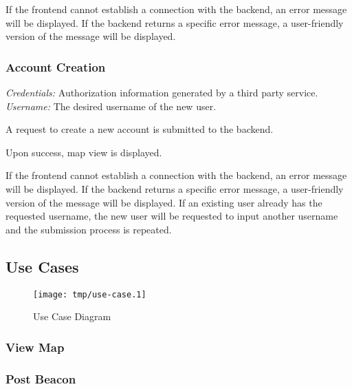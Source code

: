                 If the frontend cannot establish a connection with the backend,
                an error message will be displayed. \newline
                If the backend returns a specific error message, a user-friendly
                version of the message will be displayed.

        \subsubsection{Account Creation}
                \textit{Credentials:} Authorization information generated by a third
                                        party service. \newline
                \textit{Username:} The desired username of the new user.

                A request to create a new account is submitted to the backend.

                Upon success, map view is displayed.

                If the frontend cannot establish a connection with the backend,
                an error message will be displayed. \newline
                If the backend returns a specific error message, a user-friendly
                version of the message will be displayed. \newline
                If an existing user already has the requested username, the new user
                will be requested to input another username and the submission process
                is repeated.

    \subsection{Use Cases}
        \begin{figure}[H]
            \centering
            \texttt{[image: tmp/use-case.1]} 
            \caption{Use Case Diagram}
        \end{figure}

        \subsubsection{View Map}
        \subsubsection{Post Beacon}
